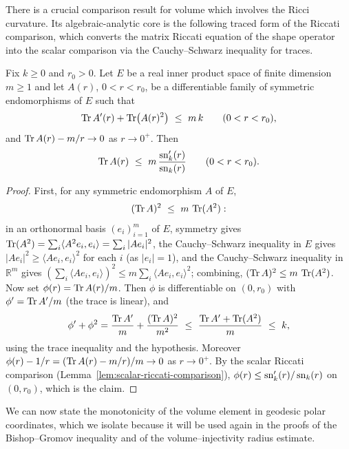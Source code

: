 There is a crucial comparison result for volume which involves the
Ricci curvature. Its algebraic-analytic core is the following traced
form of the Riccati comparison, which converts the matrix Riccati
equation of the shape operator into the scalar comparison via the
Cauchy--Schwarz inequality for traces.

\begin{lemma}
\label{lem:trace-riccati-comparison}





Fix $k\ge0$ and $r_0>0$. Let $E$ be a real inner product space of
finite dimension $m\ge1$ and let $A(r)$, $0<r<r_0$, be a
differentiable family of symmetric endomorphisms of $E$ such that
$$\operatorname{Tr} A'(r)+\operatorname{Tr}\!\left(A(r)^2\right)\ \le\ m\,k
\qquad(0<r<r_0),$$
and $\operatorname{Tr} A(r)-m/r\to0$ as $r\to0^+$. Then
$$\Tr A(r)\ \le\ m\,\frac{\sn_k'(r)}{\sn_k(r)}\qquad(0<r<r_0).$$
\end{lemma}

\begin{proof}
\sketch
{}

First, for any symmetric endomorphism $A$ of $E$,
$$(\operatorname{Tr} A)^2\ \le\ m\,\operatorname{Tr}(A^2):$$
in an orthonormal basis $(e_i)_{i=1}^m$ of $E$, symmetry gives
$\operatorname{Tr}(A^2)=\sum_i\langle A^2e_i,e_i\rangle=\sum_i|Ae_i|^2$, the
Cauchy--Schwarz inequality in $E$ gives
$|Ae_i|^2\ge\langle Ae_i,e_i\rangle^2$ for each $i$ (as $|e_i|=1$),
and the Cauchy--Schwarz inequality in $\mathbb{R}^m$ gives
$\left(\sum_i\langle Ae_i,e_i\rangle\right)^2
\le m\sum_i\langle Ae_i,e_i\rangle^2$; combining,
$(\operatorname{Tr} A)^2\le m\,\operatorname{Tr}(A^2)$. Now set $\phi(r)=\operatorname{Tr} A(r)/m$. Then
$\phi$ is differentiable on $(0,r_0)$ with $\phi'=\operatorname{Tr} A'/m$ (the
trace is linear), and
$$\phi'+\phi^2=\frac{\operatorname{Tr} A'}{m}+\frac{(\operatorname{Tr} A)^2}{m^2}
\ \le\ \frac{\operatorname{Tr} A'+\operatorname{Tr}(A^2)}{m}\ \le\ k,$$
using the trace inequality and the hypothesis. Moreover
$\phi(r)-1/r=(\operatorname{Tr} A(r)-m/r)/m\to0$ as $r\to0^+$. By the scalar
Riccati comparison (Lemma~\ref{lem:scalar-riccati-comparison}),
$\phi(r)\le\operatorname{sn}_k'(r)/\operatorname{sn}_k(r)$ on $(0,r_0)$, which is the claim.
\end{proof}

We can now state the monotonicity of the volume element in geodesic
polar coordinates, which we isolate because it will be used again in
the proofs of the Bishop--Gromov inequality and of the
volume--injectivity radius estimate.

